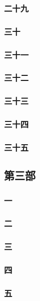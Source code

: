 \subsubsection*{二十九}
\subsubsection*{三十}
\subsubsection*{三十一}
\subsubsection*{三十二}
\subsubsection*{三十三}
\subsubsection*{三十四}
\subsubsection*{三十五}







\subsection*{第三部}



\subsubsection*{一}
\subsubsection*{二}
\subsubsection*{三}
\subsubsection*{四}
\subsubsection*{五}
